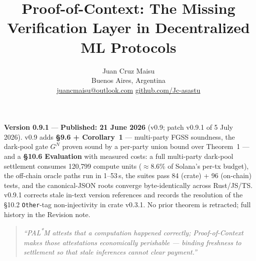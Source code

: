 \documentclass[11pt]{article}
\title{Proof-of-Context: The Missing Verification Layer in Decentralized ML Protocols}
\author{Juan Cruz Maisu\\
Buenos Aires, Argentina\\
\href{mailto:juancmaisu@outlook.com}{juancmaisu@outlook.com} \quad\textperiodcentered\quad \href{https://github.com/Jc-asastu}{github.com/Jc-asastu}}
\date{}
\begin{document}
\maketitle

{\small\noindent\textbf{Version 0.9.1} --- \textbf{Published: 21 June 2026} (v0.9; patch v0.9.1 of 5 July 2026). v0.9 adds \textbf{\S9.6 + Corollary~1} --- multi-party FGSS soundness, the dark-pool gate $G^N$ proven sound by a per-party union bound over Theorem~1 --- and a \textbf{\S10.6 Evaluation} with measured costs: a full multi-party dark-pool settlement consumes 120{,}799 compute units ($\approx$8.6\% of Solana's per-tx budget), the off-chain oracle paths run in 1--53\,\textmu{}s, the suites pass 84 (crate) + 96 (on-chain) tests, and the canonical-JSON roots converge byte-identically across Rust/JS/TS. v0.9.1 corrects stale in-text version references and records the resolution of the \S10.2 \texttt{Other}-tag non-injectivity in crate v0.3.1. No prior theorem is retracted; full history in the Revision note.\par}

\bigskip

\begin{quote}
\itshape
``PAL\textsuperscript{*}M attests that a computation happened correctly; Proof-of-Context makes those attestations economically perishable --- binding freshness to settlement so that stale inferences cannot clear payment.''
\end{quote}
\end{document}
